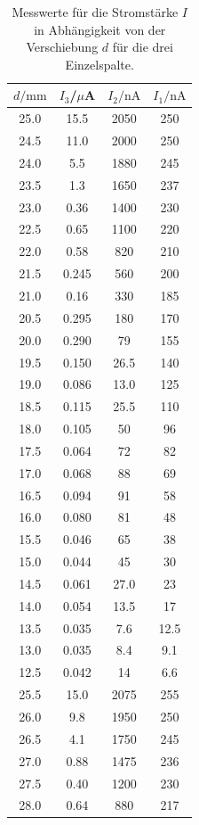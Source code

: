 \begin{table}
  \caption{Messwerte für die Stromstärke $I$ in Abhängigkeit von der Verschiebung $d$ für die drei Einzelspalte.}
  \centering
  \label{tab:messwerte}
  \footnotesize
  \begin{tabular}{c c c c}
    \toprule
   $d/\si{\milli\meter}$ & $I_3$/$\mu$\si{\ampere} & $I_2/\si{\nano\ampere}$ & $I_1/\si{\nano\ampere}$ \\
   \midrule
25.0 & 15.5 & 2050 &250 \\
24.5 & 11.0 & 2000 & 250 \\
24.0 & 5.5  & 1880 & 245 \\
23.5 & 1.3  & 1650 & 237 \\
23.0 & 0.36 & 1400 & 230 \\
22.5 & 0.65 & 1100 & 220 \\
22.0 & 0.58 & 820 & 210 \\
21.5 & 0.245 & 560 & 200 \\
21.0 & 0.16 & 330 & 185 \\
20.5 & 0.295 & 180 & 170 \\
20.0 & 0.290 & 79 & 155 \\
19.5 & 0.150 & 26.5 & 140 \\
19.0 & 0.086 & 13.0 & 125 \\
18.5 & 0.115 & 25.5 & 110 \\
18.0 & 0.105 & 50 & 96 \\
17.5 & 0.064 & 72 & 82 \\
17.0 & 0.068 & 88 & 69 \\
16.5 & 0.094 & 91 & 58 \\
16.0 & 0.080 & 81 & 48 \\
15.5 & 0.046 & 65 & 38 \\
15.0 & 0.044 & 45 & 30 \\
14.5 & 0.061 & 27.0 & 23 \\
14.0 & 0.054 & 13.5 & 17 \\
13.5 & 0.035 & 7.6 & 12.5 \\
13.0 & 0.035 & 8.4 & 9.1 \\
12.5 & 0.042 & 14  & 6.6 \\
25.5 & 15.0 & 2075 & 255 \\
26.0 & 9.8  & 1950 & 250 \\
26.5 & 4.1  & 1750 & 245 \\
27.0 & 0.88 & 1475 & 236 \\
27.5 & 0.40 & 1200 & 230 \\
28.0 & 0.64 & 880 & 217 \\

\end{tabular}
\end{table}
